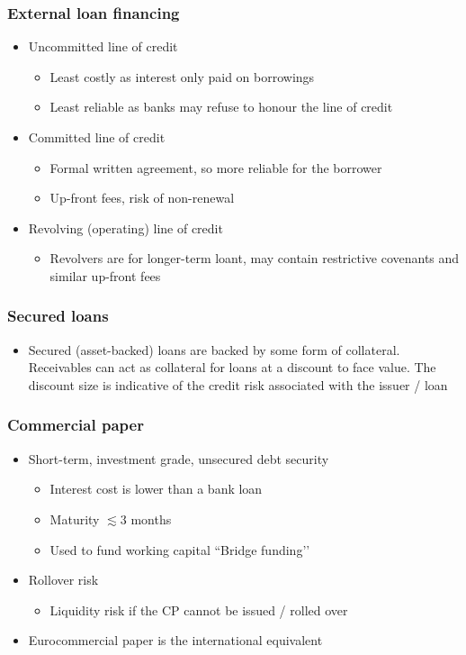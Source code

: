 \documentclass[../notes_compiled.tex]{subfiles}
\begin{document}
\subsubsection*{External loan financing}
\begin{itemize}
\item Uncommitted line of credit
\begin{itemize}
\item Least costly as interest only paid on borrowings
\item Least reliable as banks may refuse to honour the line of credit
\end{itemize}
\item Committed line of credit
\begin{itemize}
\item Formal written agreement, so more reliable for the borrower
\item Up-front fees, risk of non-renewal
\end{itemize}
\item Revolving (operating) line of credit
\begin{itemize}
\item Revolvers are for longer-term loant, may contain restrictive covenants and similar up-front fees
\end{itemize}
\end{itemize}

\subsubsection*{Secured loans}
\begin{itemize}
\item Secured (asset-backed) loans are backed by some form of collateral. Receivables can act as collateral for loans at a discount to face value. The discount size is indicative of the credit risk associated with the issuer / loan
\end{itemize}

\subsubsection*{Commercial paper}
\begin{itemize}
\item Short-term, investment grade, unsecured debt security
\begin{itemize}
\item Interest cost is lower than a bank loan
\item Maturity $\lesssim3$ months
\item Used to fund working capital ``Bridge funding’’
\end{itemize}
\item Rollover risk
\begin{itemize}
\item Liquidity risk if the CP cannot be issued / rolled over
\end{itemize}
\item Eurocommercial paper is the international equivalent
\end{itemize}
\end{document}
